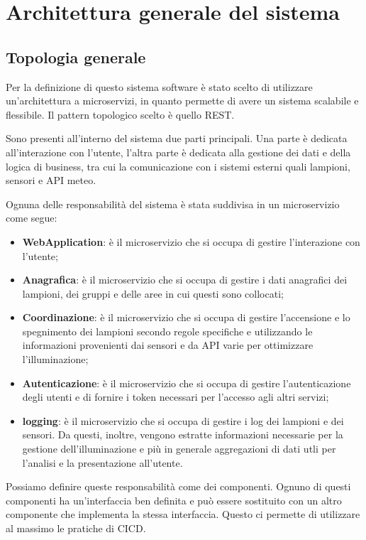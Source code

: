 \chapter{Architettura generale del sistema} \label{cap:architettura-generale}

\section{Topologia generale} \label{sec:topologia_generale}

Per la definizione di questo sistema software è stato scelto di utilizzare un'architettura a microservizi, in quanto permette di avere un sistema scalabile e flessibile. Il pattern topologico scelto è quello REST.

Sono presenti all'interno del sistema due parti principali. Una parte è dedicata all'interazione con l'utente, l'altra parte è dedicata alla gestione dei dati e della logica di business, tra cui la comunicazione con i sistemi esterni quali lampioni, sensori e API meteo.

Ognuna delle responsabilità del sistema è stata suddivisa in un microservizio come segue:

\begin{itemize}
    \item \textbf{WebApplication}: è il microservizio che si occupa di gestire l'interazione con l'utente;
    \item \textbf{Anagrafica}: è il microservizio che si occupa di gestire i dati anagrafici dei lampioni, dei gruppi e delle aree in cui questi sono collocati;
    \item \textbf{Coordinazione}: è il microservizio che si occupa di gestire l'accensione e lo spegnimento dei lampioni secondo regole specifiche e utilizzando le informazioni provenienti dai sensori e da API varie per ottimizzare l'illuminazione;
    \item \textbf{Autenticazione}: è il microservizio che si occupa di gestire l'autenticazione degli utenti e di fornire i token necessari per l'accesso agli altri servizi;
    \item \textbf{logging}: è il microservizio che si occupa di gestire i log dei lampioni e dei sensori. Da questi, inoltre, vengono estratte informazioni necessarie per la gestione dell'illuminazione e più in generale aggregazioni di dati utli per l'analisi e la presentazione all'utente.
\end{itemize}

Possiamo definire queste responsabilità come dei componenti. Ognuno di questi componenti ha un'interfaccia ben definita e può essere sostituito con un altro componente che implementa la stessa interfaccia. Questo ci permette di utilizzare al massimo le pratiche di CICD.

